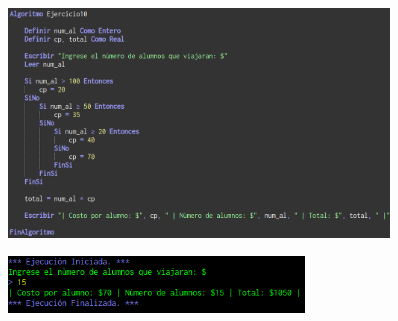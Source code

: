 \documentclass[12pt]{article}
\begin{document}
\begin{enumerate}
                \newpage
                \begin{figure}[!h]
                    \centering
                    \includegraphics[width=0.9\textwidth]{Img/Cod_ej10.png}
                \end{figure}

                \begin{figure}[!h]
                    \centering
                    \includegraphics[width=0.7\textwidth]{Img/Ejec_ej10.png}
                \end{figure}
        
        \end{enumerate}
\end{document}
